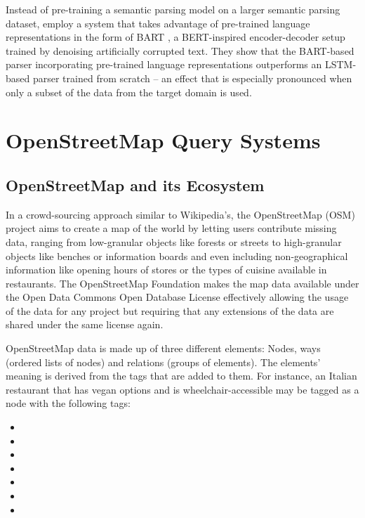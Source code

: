Instead of pre-training a semantic parsing model on a larger semantic parsing
dataset, \textcite{chen-2020} employ a system that takes advantage of
pre-trained language representations in the form of BART \parencite{lewis-2020},
a BERT-inspired encoder-decoder setup trained by denoising artificially
corrupted text. They show that the BART-based parser incorporating pre-trained
language representations outperforms an LSTM-based \parencite{hochreiter-1997}
parser trained from scratch – an effect that is especially pronounced when only
a subset of the data from the target domain is used.

\section{OpenStreetMap Query Systems}

\subsection{OpenStreetMap and its Ecosystem}
\label{sec:osm}

In a crowd-sourcing approach similar to Wikipedia’s, the
OpenStreetMap (OSM) project aims to create a map
of the world by letting users contribute missing data, ranging from low-granular
objects like forests or streets to high-granular objects like benches or
information boards and even including non-geographical information like opening
hours of stores or the types of cuisine available in restaurants. The
OpenStreetMap Foundation makes the map data available under the Open Data
Commons Open Database License effectively allowing the
usage of the data for any project but requiring that any extensions of the data
are shared under the same license again.

OpenStreetMap data is made up of three different elements: Nodes, ways (ordered
lists of nodes) and relations (groups of elements). The elements’ meaning is
derived from the tags that are added to them. For instance, an Italian
restaurant that has vegan options and is wheelchair-accessible may be tagged as
a node with the following tags:

\begin{itemize}
\item {}
\item {}
\item {}
\item {}
\item {}
\item {}
\item {}
\end{itemize}

